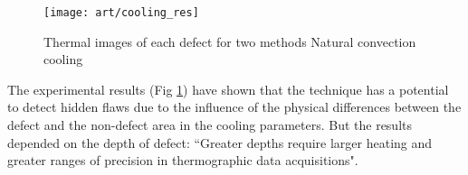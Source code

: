 \begin{figure}
	\hspace{-45pt}
	\texttt{[image: art/cooling\_res]}
	\caption{Thermal images of each defect for two methods Natural convection cooling}
	\label{cooling_res}
\end{figure}
The experimental results (Fig \ref{cooling_res}) have shown that the technique has a potential to detect hidden flaws due to the influence of the physical differences between the defect and the non-defect area in the cooling parameters. But the results depended on the depth of defect: ``Greater depths require larger heating and greater ranges of precision in thermographic data acquisitions".

 
\newpage
